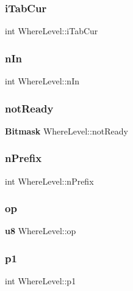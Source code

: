 \subsubsection{iTabCur}
{\footnotesize\ttfamily int Where\+Level\+::i\+Tab\+Cur}

\mbox{\label{struct_where_level_a276238755297111ab44551dcf4f61392}} 
\subsubsection{nIn}
{\footnotesize\ttfamily int Where\+Level\+::n\+In}

\mbox{\label{struct_where_level_aed1e0964182444c84ceaad061acc473c}} 
\subsubsection{notReady}
{\footnotesize\ttfamily \textbf{ Bitmask} Where\+Level\+::not\+Ready}

\mbox{\label{struct_where_level_afa6fe09f915a6d50fb38c6b03fa53cea}} 
\subsubsection{nPrefix}
{\footnotesize\ttfamily int Where\+Level\+::n\+Prefix}

\mbox{\label{struct_where_level_a0253c213b81cd17481601e495d421706}} 
\subsubsection{op}
{\footnotesize\ttfamily \textbf{ u8} Where\+Level\+::op}

\mbox{\label{struct_where_level_ad544492b3388cb82a4b3674e6c1fdb07}} 
\subsubsection{p1}
{\footnotesize\ttfamily int Where\+Level\+::p1}

\mbox{\label{struct_where_level_a9c60432a75f2252764e78128e4dad19b}} 

